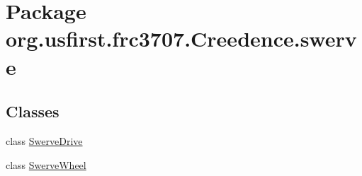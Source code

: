 \hypertarget{namespaceorg_1_1usfirst_1_1frc3707_1_1_creedence_1_1swerve}{}\section{Package org.\+usfirst.\+frc3707.\+Creedence.\+swerve}
\label{namespaceorg_1_1usfirst_1_1frc3707_1_1_creedence_1_1swerve}
\subsection*{Classes}
\begin{DoxyCompactItemize}
\item 
class \mbox{\hyperlink{classorg_1_1usfirst_1_1frc3707_1_1_creedence_1_1swerve_1_1_swerve_drive}{Swerve\+Drive}}
\item 
class \mbox{\hyperlink{classorg_1_1usfirst_1_1frc3707_1_1_creedence_1_1swerve_1_1_swerve_wheel}{Swerve\+Wheel}}
\end{DoxyCompactItemize}
